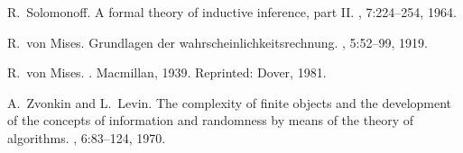 \begin{thebibliography}{9}
R.~Solomonoff.
\newblock A formal theory of inductive inference, part II.
, 7:224--254, 1964.

R.~von Mises.
\newblock Grundlagen der wahrscheinlichkeitsrechnung.
, 5:52--99, 1919.

R.~von Mises.
.
\newblock Macmillan, 1939.
\newblock Reprinted: Dover, 1981.

A.~Zvonkin and L.~Levin.
\newblock The complexity of finite objects
and the development of the concepts of information
and randomness by means of the theory of algorithms.
, 6:83--124, 1970.

\end{thebibliography}


